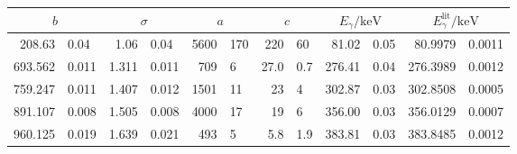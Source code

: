 \label{tab:D}
	\begin{tabular}{r@{${}\pm{}$}lr@{${}\pm{}$}lr@{${}\pm{}$}lr@{${}\pm{}$}lr@{${}\pm{}$}lr@{${}\pm{}$}l}
		\toprule
		\multicolumn{2}{c}{$b$} & \multicolumn{2}{c}{$\sigma$} & \multicolumn{2}{c}{$a$} & \multicolumn{2}{c}{$c$} & \multicolumn{2}{c}{$E_\gamma/\si{\kilo\electronvolt}$} & \multicolumn{2}{c}{$E_\gamma^{\text{lit}}/\si{\kilo\electronvolt}$} \\
		\midrule
		208.63  & 0.04  & 1.06  & 0.04  & 5600 & 170 & 220  & 60  & 81.02 & 0.05 & 80.9979 & 0.0011 \\
		693.562 & 0.011 & 1.311 & 0.011 &  709 &   6 & 27.0 & 0.7 & 276.41 & 0.04 & 276.3989 & 0.0012 \\
		759.247 & 0.011 & 1.407 & 0.012 & 1501 &  11 & 23   & 4   & 302.87 & 0.03 & 302.8508 & 0.0005 \\
		891.107 & 0.008 & 1.505 & 0.008 & 4000 &  17 & 19   & 6   & 356.00 & 0.03 & 356.0129 & 0.0007 \\
		960.125 & 0.019 & 1.639 & 0.021 &  493 &   5 & 5.8  & 1.9 & 383.81 & 0.03 & 383.8485 & 0.0012 \\
		\bottomrule
	\end{tabular}
